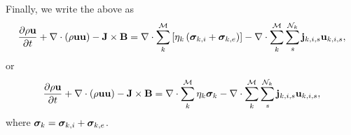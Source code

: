 \documentclass[a4paper,11pt]{report}
\begin{document}
Finally, we write the above as
\begin{equation*}
    \frac{\partial \rho \mathbf{u}}{\partial t} + \nabla \cdot \left( \rho \mathbf{u} \mathbf{u} \right) - \mathbf{J} \times \mathbf{B} = \nabla \cdot \sum_k^\mathcal{M} \left[ \eta_k \left( \bm \sigma_{k,i} + \bm \sigma_{k,e} \right) \right] - \nabla \cdot \sum_k^\mathcal{M} \sum_s^{\mathcal{N}_k} \mathbf{j}_{k,i,s} \mathbf{u}_{k,i,s},
\end{equation*}
or 
\begin{equation*}
    \frac{\partial \rho \mathbf{u}}{\partial t} + \nabla \cdot \left( \rho \mathbf{u} \mathbf{u} \right) - \mathbf{J} \times \mathbf{B} = \nabla \cdot \sum_k^\mathcal{M} \eta_k \bm \sigma_k - \nabla \cdot \sum_k^\mathcal{M} \sum_s^{\mathcal{N}_k} \mathbf{j}_{k,i,s} \mathbf{u}_{k,i,s},
\end{equation*}
where $\bm \sigma_k = \bm \sigma_{k,i} + \bm \sigma_{k,e}$.
\end{document}
